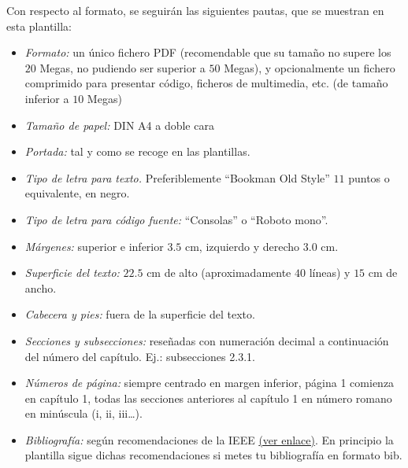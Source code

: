 Con respecto al formato, se seguirán las siguientes pautas, que se muestran en esta plantilla:
\begin{itemize}
\item \textit{Formato:} un único fichero PDF (recomendable que su tamaño no supere los $20$ Megas, no pudiendo ser superior a $50$ Megas), y opcionalmente un fichero comprimido para presentar código, ficheros de multimedia, etc. (de tamaño inferior a $10$ Megas)
\item \textit{Tamaño de papel:} DIN A4 a doble cara
\item \textit{Portada:} tal y como se recoge en las plantillas.
\item \textit{Tipo de letra para texto.} Preferiblemente ``Bookman Old Style'' $11$ puntos o equivalente, en negro.
\item \textit{Tipo de letra para código fuente:} ``Consolas'' o ``Roboto mono''.
\item \textit{Márgenes:} superior e inferior $3.5$ cm, izquierdo y derecho $3.0$ cm.
\item \textit{Superficie del texto:} $22.5$ cm de alto (aproximadamente $40$ líneas) y $15$ cm de ancho.
\item \textit{Cabecera y pies:} fuera de la superficie del texto.
\item \textit{Secciones y subsecciones:} reseñadas con numeración decimal a continuación del número del capítulo. Ej.: subsecciones 2.3.1.
\item \textit{Números de página:} siempre centrado en margen inferior, página 1 comienza en capítulo 1, todas las secciones anteriores al capítulo 1 en número romano en minúscula (i, ii, iii…).
\item \textit{Bibliografía:} según recomendaciones de la IEEE
\href{https://www.etsiinf.upm.es/docs/estudios/grado/1475_ieeecitationref.pdf}{(ver enlace)}. En principio la plantilla sigue dichas recomendaciones si metes tu bibliografía en formato bib.
\end{itemize}

\medskip

